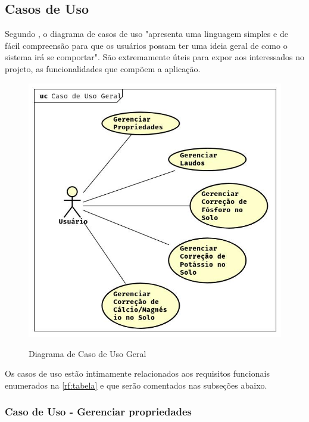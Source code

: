\subsection{Casos de Uso}
\label{sec:titSecCasoUso}

Segundo , o diagrama de casos de uso "apresenta uma linguagem simples e de fácil compreensão para que os usuários possam ter uma ideia geral de como o sistema irá se comportar". São extremamente úteis para expor aos interessados no projeto, as funcionalidades que compõem a aplicação.

\begin{figure}[H]
    \centering
    \caption{Diagrama de Caso de Uso Geral}
    \includegraphics[width=13cm]{dados/figuras/casouso.jpg}
    \label{fig:diagramaCasoUso}
\end{figure}

Os casos de uso estão intimamente relacionados aos requisitos funcionais enumerados na \autoref{rf:tabela} e que serão comentados nas subseções abaixo.

\subsubsection{Caso de Uso - Gerenciar propriedades}
\label{sec:titSecCasoUsoPropriedades}

